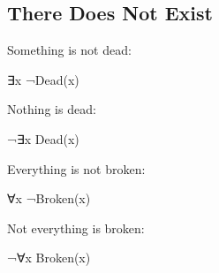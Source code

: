 \documentclass[12pt]{extarticle}
\begin{document}
\begin{multicols*}{3}
 
\section{There Does Not Exist}
 
Something is not dead:
 
\hspace{3mm} ∃x ¬Dead(x)
 
Nothing is dead:
 
\hspace{3mm} ¬∃x Dead(x)
 
Everything is not broken:
 
\hspace{3mm} ∀x ¬Broken(x)
 
Not everything is broken:
 
\hspace{3mm} ¬∀x Broken(x)
 

\end{multicols*}
\end{document}
